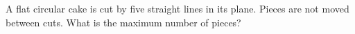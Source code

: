 A flat circular cake is cut by five straight lines in its plane. Pieces are not moved between cuts. What is the maximum number of pieces?

